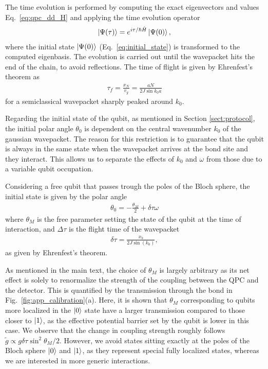 \documentclass[10pt,
 amsmath,amssymb,
 aps,prb, twocolumn
]{revtex4-2}
\begin{document}
The time evolution is performed by computing the exact eigenvectors and values Eq.~\eqref{eq:qpc_dd_H} and applying the time evolution operator
\begin{align}\label{eq:time_evolution_ed}
    \ket{\Psi{(\tau)}} = e^{i\tau/\hbar \hat{H}}\ket{\Psi (0)},
\end{align}
where the initial state \mbox{$\ket{\Psi (0)}$} (Eq.~\eqref{eq:initial_state}) is transformed to the computed eigenbasis. The evolution is carried out until the wavepacket hits the end of the chain, to avoid reflections. The time of flight is given by Ehrenfest's theorem as
\begin{align}\label{eq:final_time}
    \tau_f = \frac{x_N}{v_g} =  \frac{a N}{2 J \sin{k_0a}}
\end{align}
for a semiclassical wavepacket sharply peaked around $k_0$.

Regarding the initial state of the qubit, as mentioned in Section \ref{sect:protocol}, the initial polar angle $\theta_0$ is dependent on the central wavenumber $k_0$ of the gaussian wavepacket. The reason for this restriction is to guarantee that the qubit is always in the same state when the wavepacket arrives at the bond site and they interact. This allows us to separate the effects of $k_0$ and $\omega$ from those due to a variable qubit occupation. 

Considering a free qubit that passes trough the poles of the Bloch sphere, the initial state is given by the polar angle
\begin{align}\label{eq:qubit_init}
    \theta_0 = - \frac{\theta_M}{2}+\delta\tau \omega
\end{align}
where $\theta_M$ is the free parameter setting the state of the qubit at the time of interaction, and $\Delta \tau$ is the flight time of the wavepacket 
\begin{align}
    \delta \tau = \frac{x_b}{2J\sin(k_0)},
\end{align}
as given by Ehrenfest's theorem.

As mentioned in the main text, the choice of \mbox{$\theta_M$} is largely arbitrary as its net effect is solely to renormalize the strength of the coupling between the QPC and the detector. This is quantified by the transmission through the bond in Fig.~\ref{fig:app_calibration}(a). Here, it is shown that \mbox{$\theta_M$} corresponding to qubits more localized in the \mbox{$\ket{0}$} state have a larger transmission compared to those closer to \mbox{$\ket{1}$}, as the effective potential barrier set by the qubit is lower in this case. We observe that the change in coupling strength roughly follows \mbox{$\tilde{g} \propto g \delta\tau\sin^2\theta_M/2$}. However, we avoid states sitting exactly at the poles of the Bloch sphere \mbox{$\ket{0}$} and \mbox{$\ket{1}$}, as they represent special fully localized states, whereas we are interested in more generic interactions.
\end{document}
